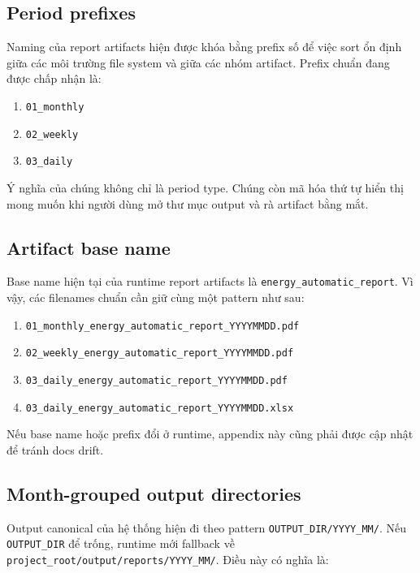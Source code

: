 \subsection{Period prefixes}

Naming của report artifacts hiện được khóa bằng prefix số để việc sort ổn định giữa các môi trường file system và giữa các nhóm artifact. Prefix chuẩn đang được chấp nhận là:

\begin{enumerate}[label=-]
\item \texttt{01\_monthly}
\item \texttt{02\_weekly}
\item \texttt{03\_daily}
\end{enumerate}

Ý nghĩa của chúng không chỉ là period type. Chúng còn mã hóa thứ tự hiển thị mong muốn khi người dùng mở thư mục output và rà artifact bằng mắt.

\subsection{Artifact base name}

Base name hiện tại của runtime report artifacts là \texttt{energy\_automatic\_report}. Vì vậy, các filenames chuẩn cần giữ cùng một pattern như sau:

\begin{enumerate}[label=-]
\item \texttt{01\_monthly\_energy\_automatic\_report\_YYYYMMDD.pdf}
\item \texttt{02\_weekly\_energy\_automatic\_report\_YYYYMMDD.pdf}
\item \texttt{03\_daily\_energy\_automatic\_report\_YYYYMMDD.pdf}
\item \texttt{03\_daily\_energy\_automatic\_report\_YYYYMMDD.xlsx}
\end{enumerate}

Nếu base name hoặc prefix đổi ở runtime, appendix này cũng phải được cập nhật để tránh docs drift.

\subsection{Month-grouped output directories}

Output canonical của hệ thống hiện đi theo pattern \texttt{OUTPUT\_DIR/YYYY\_MM/}. Nếu \texttt{OUTPUT\_DIR} để trống, runtime mới fallback về \texttt{project\_root/output/reports/YYYY\_MM/}. Điều này có nghĩa là:

